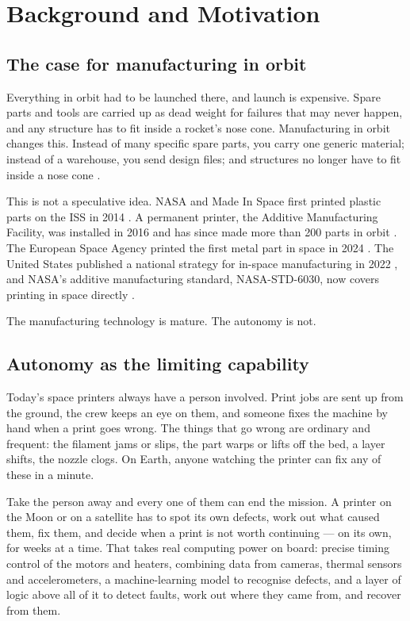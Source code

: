 \documentclass[11pt,a4paper]{article}
\begin{document}
\section{Background and Motivation}

\subsection{The case for manufacturing in orbit}

Everything in orbit had to be launched there, and launch is expensive. Spare
parts and tools are carried up as dead weight for failures that may never happen,
and any structure has to fit inside a rocket's nose cone. Manufacturing in orbit
changes this. Instead of many specific spare parts, you carry one generic
material; instead of a warehouse, you send design files; and structures no longer
have to fit inside a nose cone \cite{isam_sop2023}.

This is not a speculative idea. NASA and Made In Space first printed plastic
parts on the ISS in 2014 \cite{prater2019zerog}. A permanent printer, the Additive
Manufacturing Facility, was installed in 2016 and has since made more than 200
parts in orbit \cite{issnl_amf}. The European Space Agency printed the first metal
part in space in 2024 \cite{esa_metal3d}. The United States published a national
strategy for in-space manufacturing in 2022 \cite{isam_strategy2022}, and NASA's
additive manufacturing standard, NASA-STD-6030, now covers printing in space
directly \cite{nasastd6030}.

The manufacturing technology is mature. The autonomy is not.

\subsection{Autonomy as the limiting capability}

Today's space printers always have a person involved. Print jobs are sent up from
the ground, the crew keeps an eye on them, and someone fixes the machine by hand
when a print goes wrong. The things that go wrong are ordinary and frequent: the
filament jams or slips, the part warps or lifts off the bed, a layer shifts, the
nozzle clogs. On Earth, anyone watching the printer can fix any of these in a
minute.

Take the person away and every one of them can end the mission. A printer on the
Moon or on a satellite has to spot its own defects, work out what caused them, fix
them, and decide when a print is not worth continuing --- on its own, for weeks at
a time. That takes real computing power on board: precise timing control of the
motors and heaters, combining data from cameras, thermal sensors and
accelerometers, a machine-learning model to recognise defects, and a layer of
logic above all of it to detect faults, work out where they came from, and recover
from them.
\end{document}
